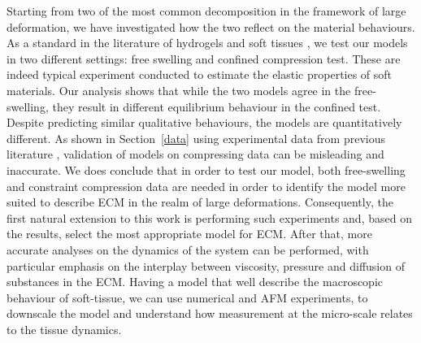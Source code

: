 Starting from two of the most common decomposition in the framework of large deformation, we have investigated how the two reflect on the material behaviours. As a standard in the literature of hydrogels and soft tissues \cite{DROSDOVph,Article1,ecm2}, we test our models in two different settings: free swelling and confined compression test. These are indeed typical experiment conducted to estimate the elastic properties of soft materials. Our analysis shows that while the two models agree in the free-swelling, they result in different equilibrium behaviour in the confined test. Despite predicting similar qualitative behaviours, the models are quantitatively different. As shown in Section~\ref{data} using experimental data from previous literature \cite{Netti}, validation of models on compressing data can be misleading and inaccurate. We does conclude that in order to test our model, both free-swelling and constraint compression data are needed in order to identify the model more suited to describe ECM in the realm of large deformations. Consequently, the first natural extension to this work is performing such experiments and, based on the results, select the most appropriate model for ECM. After that, more accurate analyses on the dynamics of the system can be performed, with particular emphasis on the interplay between viscosity, pressure and diffusion of substances in the ECM. Having a model that well describe the macroscopic behaviour of soft-tissue, we can use numerical  and  AFM experiments, to downscale the model and understand how measurement at the micro-scale relates to the tissue dynamics. 